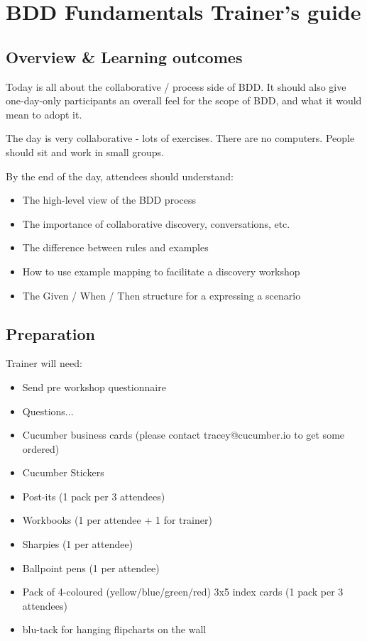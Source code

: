 \chapter*{BDD Fundamentals Trainer's guide}

\section*{Overview \& Learning outcomes}

Today is all about the collaborative / process side of BDD. It should also give one-day-only participants an overall feel for the scope of BDD, and what it would mean to adopt it.

The day is very collaborative - lots of exercises. There are no computers. People should sit and work in small groups.

By the end of the day, attendees should understand:

\begin{itemize}
    \item The high-level view of the BDD process
    \item The importance of collaborative discovery, conversations, etc.
    \item The difference between rules and examples
    \item How to use example mapping to facilitate a discovery workshop
    \item The Given / When / Then structure for a expressing a scenario
\end{itemize}

\section*{Preparation}

Trainer will need:
\begin{itemize}
    \item Send pre workshop questionnaire
    \item Questions...
    \item Cucumber business cards (please contact tracey@cucumber.io to get some ordered)
    \item Cucumber Stickers
    \item Post-its (1 pack per 3 attendees)
    \item Workbooks (1 per attendee + 1 for trainer)
    \item Sharpies (1 per attendee)
    \item Ballpoint pens (1 per attendee)
    \item Pack of 4-coloured (yellow/blue/green/red) 3x5 index cards (1 pack per 3 attendees)
    \item blu-tack for hanging flipcharts on the wall
\end{itemize}


